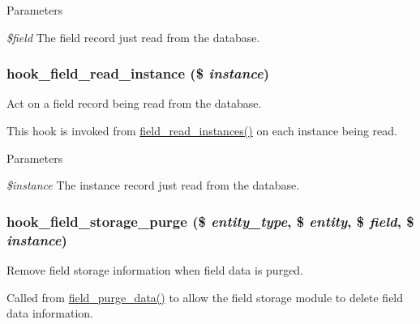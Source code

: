 \begin{DoxyParams}{Parameters}
\item[{\em \$field}]The field record just read from the database. \end{DoxyParams}
\hypertarget{group__field__crud_gaf3812ab3837b9b2757dd3d7a1dfb2153}{
\subsubsection[{hook\_\-field\_\-read\_\-instance}]{\setlength{\rightskip}{0pt plus 5cm}hook\_\-field\_\-read\_\-instance (\$ {\em instance})}}
\label{group__field__crud_gaf3812ab3837b9b2757dd3d7a1dfb2153}
Act on a field record being read from the database.

This hook is invoked from \hyperlink{group__field__crud_ga1d162c4a29778ee31d1d815324223ae6}{field\_\-read\_\-instances()} on each instance being read.


\begin{DoxyParams}{Parameters}
\item[{\em \$instance}]The instance record just read from the database. \end{DoxyParams}
\hypertarget{group__field__crud_gab26211d5d58698d2446bfd855f6137c9}{
\subsubsection[{hook\_\-field\_\-storage\_\-purge}]{\setlength{\rightskip}{0pt plus 5cm}hook\_\-field\_\-storage\_\-purge (\$ {\em entity\_\-type}, \/  \$ {\em entity}, \/  \$ {\em field}, \/  \$ {\em instance})}}
\label{group__field__crud_gab26211d5d58698d2446bfd855f6137c9}
Remove field storage information when field data is purged.

Called from \hyperlink{group__field__purge_ga93ec2f273b56141a5079bfaf25d6b80e}{field\_\-purge\_\-data()} to allow the field storage module to delete field data information.


